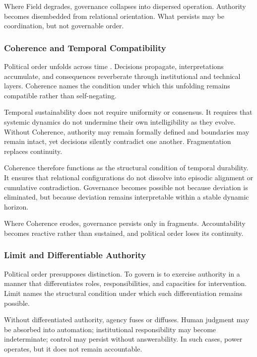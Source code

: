 \documentclass[12pt]{article}
\begin{document}
Where Field degrades, governance collapses into dispersed operation. Authority becomes disembedded from relational orientation. What persists may be coordination, but not governable order.

\subsubsection{Coherence and Temporal Compatibility}


Political order unfolds across time \citep{MarchOlsen1989}. Decisions propagate, interpretations accumulate, and consequences reverberate through institutional and technical layers. Coherence names the condition under which this unfolding remains compatible rather than self-negating.

Temporal sustainability does not require uniformity or consensus. It requires that systemic dynamics do not undermine their own intelligibility as they evolve. Without Coherence, authority may remain formally defined and boundaries may remain intact, yet decisions silently contradict one another. Fragmentation replaces continuity.

Coherence therefore functions as the structural condition of temporal durability. It ensures that relational configurations do not dissolve into episodic alignment or cumulative contradiction. Governance becomes possible not because deviation is eliminated, but because deviation remains interpretable within a stable dynamic horizon.

Where Coherence erodes, governance persists only in fragments. Accountability becomes reactive rather than sustained, and political order loses its continuity.

\subsubsection{Limit and Differentiable Authority}


Political order presupposes distinction. To govern is to exercise authority in a manner that differentiates roles, responsibilities, and capacities for intervention. Limit names the structural condition under which such differentiation remains possible.

Without differentiated authority, agency fuses or diffuses. Human judgment may be absorbed into automation; institutional responsibility may become indeterminate; control may persist without answerability. In such cases, power operates, but it does not remain accountable.
\end{document}
